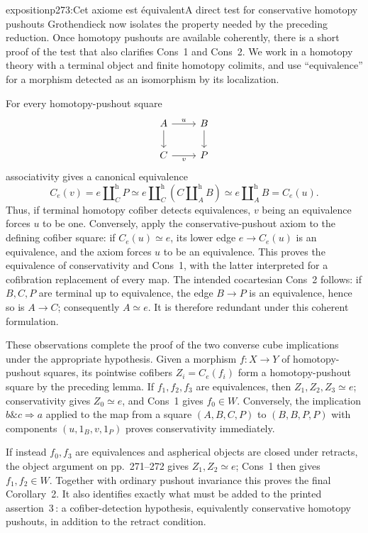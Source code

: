 \begin{dcomment}{exposition}{p273:Cet axiome est équivalent}{A direct test for conservative homotopy pushouts}
Grothendieck now isolates the property needed by the preceding reduction. Once homotopy pushouts are available coherently, there is a short proof of the test that also clarifies Cons~1 and Cons~2. We work in a homotopy theory with a terminal object and finite homotopy colimits, and use ``equivalence'' for a morphism detected as an isomorphism by its localization.

For every homotopy-pushout square
\[
\begin{tikzcd}[ampersand replacement=\&]
 A\arrow[r,"u"]\arrow[d] \& B\arrow[d]\\
 C\arrow[r,"v"'] \& P
\end{tikzcd}
\]
associativity gives a canonical equivalence
\[
 C_e(v)=e\amalg_C^{\mathrm h}P
 \simeq e\amalg_C^{\mathrm h}(C\amalg_A^{\mathrm h}B)
 \simeq e\amalg_A^{\mathrm h}B=C_e(u).
\]
Thus, if terminal homotopy cofiber detects equivalences, $v$ being an equivalence forces $u$ to be one. Conversely, apply the conservative-pushout axiom to the defining cofiber square: if $C_e(u)\simeq e$, its lower edge $e\to C_e(u)$ is an equivalence, and the axiom forces $u$ to be an equivalence. This proves the equivalence of conservativity and Cons~1, with the latter interpreted for a cofibration replacement of every map. The intended cocartesian Cons~2 follows: if $B,C,P$ are terminal up to equivalence, the edge $B\to P$ is an equivalence, hence so is $A\to C$; consequently $A\simeq e$. It is therefore redundant under this coherent formulation.

These observations complete the proof of the two converse cube implications under the appropriate hypothesis. Given a morphism $f:X\to Y$ of homotopy-pushout squares, its pointwise cofibers $Z_i=C_e(f_i)$ form a homotopy-pushout square by the preceding lemma. If $f_1,f_2,f_3$ are equivalences, then $Z_1,Z_2,Z_3\simeq e$; conservativity gives $Z_0\simeq e$, and Cons~1 gives $f_0\in W$. Conversely, the implication $b\mathbin{\&}c\Rightarrow a$ applied to the map from a square $(A,B,C,P)$ to $(B,B,P,P)$ with components $(u,1_B,v,1_P)$ proves conservativity immediately.

If instead $f_0,f_3$ are equivalences and aspherical objects are closed under retracts, the object argument on pp.~271--272 gives $Z_1,Z_2\simeq e$; Cons~1 then gives $f_1,f_2\in W$. Together with ordinary pushout invariance this proves the final Corollary~2. It also identifies exactly what must be added to the printed assertion~3\,\textdegree{}: a cofiber-detection hypothesis, equivalently conservative homotopy pushouts, in addition to the retract condition.
\end{dcomment}

